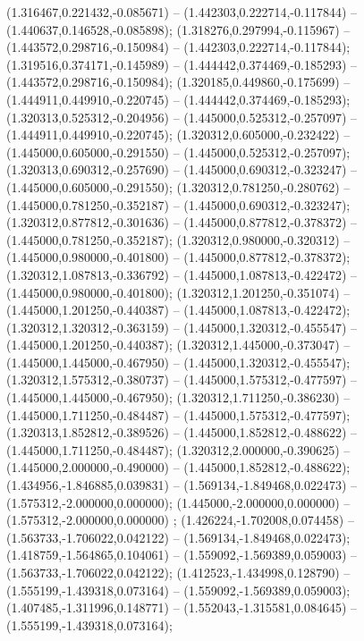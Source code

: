  (1.316467,0.221432,-0.085671) -- (1.442303,0.222714,-0.117844) -- (1.440637,0.146528,-0.085898);
 (1.318276,0.297994,-0.115967) -- (1.443572,0.298716,-0.150984) -- (1.442303,0.222714,-0.117844);
 (1.319516,0.374171,-0.145989) -- (1.444442,0.374469,-0.185293) -- (1.443572,0.298716,-0.150984);
 (1.320185,0.449860,-0.175699) -- (1.444911,0.449910,-0.220745) -- (1.444442,0.374469,-0.185293);
 (1.320313,0.525312,-0.204956) -- (1.445000,0.525312,-0.257097) -- (1.444911,0.449910,-0.220745);
 (1.320312,0.605000,-0.232422) -- (1.445000,0.605000,-0.291550) -- (1.445000,0.525312,-0.257097);
 (1.320313,0.690312,-0.257690) -- (1.445000,0.690312,-0.323247) -- (1.445000,0.605000,-0.291550);
 (1.320312,0.781250,-0.280762) -- (1.445000,0.781250,-0.352187) -- (1.445000,0.690312,-0.323247);
 (1.320312,0.877812,-0.301636) -- (1.445000,0.877812,-0.378372) -- (1.445000,0.781250,-0.352187);
 (1.320312,0.980000,-0.320312) -- (1.445000,0.980000,-0.401800) -- (1.445000,0.877812,-0.378372);
 (1.320312,1.087813,-0.336792) -- (1.445000,1.087813,-0.422472) -- (1.445000,0.980000,-0.401800);
 (1.320312,1.201250,-0.351074) -- (1.445000,1.201250,-0.440387) -- (1.445000,1.087813,-0.422472);
 (1.320312,1.320312,-0.363159) -- (1.445000,1.320312,-0.455547) -- (1.445000,1.201250,-0.440387);
 (1.320312,1.445000,-0.373047) -- (1.445000,1.445000,-0.467950) -- (1.445000,1.320312,-0.455547);
 (1.320312,1.575312,-0.380737) -- (1.445000,1.575312,-0.477597) -- (1.445000,1.445000,-0.467950);
 (1.320312,1.711250,-0.386230) -- (1.445000,1.711250,-0.484487) -- (1.445000,1.575312,-0.477597);
 (1.320313,1.852812,-0.389526) -- (1.445000,1.852812,-0.488622) -- (1.445000,1.711250,-0.484487);
 (1.320312,2.000000,-0.390625) -- (1.445000,2.000000,-0.490000) -- (1.445000,1.852812,-0.488622);
 (1.434956,-1.846885,0.039831) -- (1.569134,-1.849468,0.022473) -- (1.575312,-2.000000,0.000000);
 (1.445000,-2.000000,0.000000) -- (1.575312,-2.000000,0.000000) ;
 (1.426224,-1.702008,0.074458) -- (1.563733,-1.706022,0.042122) -- (1.569134,-1.849468,0.022473);
 (1.418759,-1.564865,0.104061) -- (1.559092,-1.569389,0.059003) -- (1.563733,-1.706022,0.042122);
 (1.412523,-1.434998,0.128790) -- (1.555199,-1.439318,0.073164) -- (1.559092,-1.569389,0.059003);
 (1.407485,-1.311996,0.148771) -- (1.552043,-1.315581,0.084645) -- (1.555199,-1.439318,0.073164);
